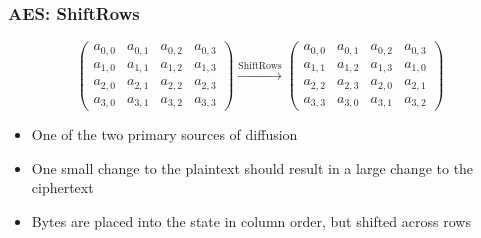 \documentclass[12pt]{beamer}
\begin{document}
\begin{frame}
\frametitle{AES: ShiftRows}

\[ \left( \begin{array}{cccc}
a_{0,0} & a_{0,1} & a_{0,2} & a_{0,3} \\[0pt]
a_{1,0} & a_{1,1} & a_{1,2} & a_{1,3} \\[0pt]
a_{2,0} & a_{2,1} & a_{2,2} & a_{2,3} \\[0pt]
a_{3,0} & a_{3,1} & a_{3,2} & a_{3,3}\end{array} \right)
\xrightarrow{\text{ShiftRows}}
\left( \begin{array}{cccc}
a_{0,0} & a_{0,1} & a_{0,2} & a_{0,3} \\[0pt]
a_{1,1} & a_{1,2} & a_{1,3} & a_{1,0} \\[0pt]
a_{2,2} & a_{2,3} & a_{2,0} & a_{2,1} \\[0pt]
a_{3,3} & a_{3,0} & a_{3,1} & a_{3,2}\end{array} \right)
\]

\pause

\begin{itemize}
\item One of the two primary sources of diffusion
\item One small change to the plaintext should result in a large change to the ciphertext
\item Bytes are placed into the state in column order, but shifted across rows
\end{itemize}
\end{frame}
\end{document}
